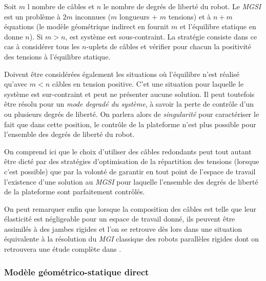Soit $m$ l nombre de câbles et $n$ le nombre de degrés de liberté du robot. Le {\it MGSI} est un problème à $2m$ inconnues ($m$ longueurs + $m$ tensions) et à $n+m$ équations (le modèle géométrique indirect en fournit $m$ et l'équilibre statique en donne $n$). Si $m > n$, est système est sous-contraint. La stratégie consiste dans ce cas à considérer tous les $n$-uplets de câbles et vérifier pour chacun la positivité des tensions à l'équilibre statique.

Doivent être considérées également les situations où l'équilibre n'est réalisé qu'avec $m < n$ câbles en tension positive. C'et une situation pour laquelle le système est sur-contraint et peut ne présenter aucune solution. Il peut toutefois être résolu pour un {\it mode degradé du système}, à savoir la perte de contrôle d'un ou plusieurs degrés de liberté. On parlera alors de {\it singularité} pour caractériser le fait que dans cette position, le contrôle de la plateforme n'est plus possible pour l'ensemble des degrés de liberté du robot.

On comprend ici que le choix d'utiliser des câbles redondants peut tout autant être dicté par des stratégies d'optimisation de la répartition des tensions (lorsque c'est possible) que par la volonté de garantir en tout point de l'espace de travail l'existence d'une solution au {\it MGSI} pour laquelle l'ensemble des degrés de liberté de la plateforme sont parfaitement contrôlés.

On peut remarquer enfin que lorsque la composition des câbles est telle que leur élasticité est négligeable pour un espace de travail donné, ils peuvent être assimilés à des jambes rigides et l'on se retrouve dès lors dans une situation équivalente à la résolution du {\it MGI} classique des robots parallèles rigides dont on retrouvera une étude complète dans \cite{merlet1997robots}.

\subsubsection{Modèle géométrico-statique direct}


